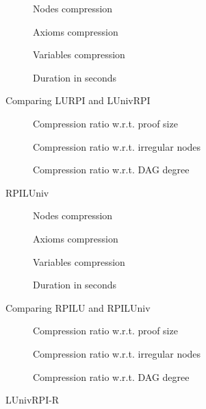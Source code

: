 \begin{figure}[hbt]
  \begin{subfigure}{0.5\textwidth}
    \centering
    \caption{Nodes compression}
  \end{subfigure}
  \begin{subfigure}{0.5\textwidth}
    \centering
    \caption{Axioms compression}
  \end{subfigure}
  \begin{subfigure}{0.5\textwidth}
    \centering
    \caption{Variables compression}
  \end{subfigure}
  \begin{subfigure}{0.5\textwidth}
    \centering
    \caption{Duration in seconds}
  \end{subfigure}
  \caption{Comparing LURPI and LUnivRPI}
\end{figure}
\begin{figure}[hbt]
  \begin{subfigure}{\textwidth}
    \centering
    \caption{Compression ratio w.r.t. proof size}
  \end{subfigure}
  \begin{subfigure}{\textwidth}
    \centering
    \caption{Compression ratio w.r.t. irregular nodes}
  \end{subfigure}
  \begin{subfigure}{\textwidth}
    \centering
    \caption{Compression ratio w.r.t. DAG degree}
  \end{subfigure}
  \caption{RPILUniv}
\end{figure}
\begin{figure}[hbt]
  \begin{subfigure}{0.5\textwidth}
    \centering
    \caption{Nodes compression}
  \end{subfigure}
  \begin{subfigure}{0.5\textwidth}
    \centering
    \caption{Axioms compression}
  \end{subfigure}
  \begin{subfigure}{0.5\textwidth}
    \centering
    \caption{Variables compression}
  \end{subfigure}
  \begin{subfigure}{0.5\textwidth}
    \centering
    \caption{Duration in seconds}
  \end{subfigure}
  \caption{Comparing RPILU and RPILUniv}
\end{figure}
\begin{figure}[hbt]
  \begin{subfigure}{\textwidth}
    \centering
    \caption{Compression ratio w.r.t. proof size}
  \end{subfigure}
  \begin{subfigure}{\textwidth}
    \centering
    \caption{Compression ratio w.r.t. irregular nodes}
  \end{subfigure}
  \begin{subfigure}{\textwidth}
    \centering
    \caption{Compression ratio w.r.t. DAG degree}
  \end{subfigure}
  \caption{LUnivRPI-R}
\end{figure}
